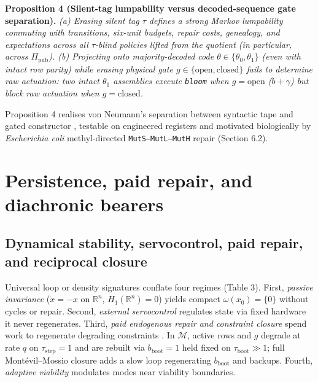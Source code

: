 \documentclass[12pt,letterpaper]{article}
\begin{document}
\textbf{Proposition 4 (Silent-tag lumpability versus decoded-sequence
gate separation).} \emph{(a) Erasing silent tag \(\tau\) defines a
strong Markov lumpability \citep{burkeRosenblatt1958} commuting with
transitions, six-unit budgets, repair costs, genealogy, and expectations
across all \(\tau\)-blind policies lifted from the quotient (in
particular, across \(\Pi_{\mathrm{pub}}\)). (b) Projecting onto
majority-decoded code \(\theta \in \{\theta_0, \theta_1\}\) (even with
intact row parity) while erasing physical gate
\(g \in \{\mathrm{open}, \mathrm{closed}\}\) fails to determine raw
actuation: two intact \(\theta_1\) assemblies execute \texttt{bloom}
when \(g=\mathrm{open}\) (\(b+\gamma\)) but block raw actuation when
\(g=\mathrm{closed}\).}

Proposition 4 realises von Neumann's \citeyearpar{vonNeumann1966}
separation between syntactic tape and gated constructor
\citep{rosen1991, deacon2011}, testable on engineered registers and
motivated biologically by \emph{Escherichia coli} methyl-directed
\texttt{MutS--MutL--MutH} repair
\citep{auWelshModrich1992, hasanLeach2015} (Section 6.2).

\section{Persistence, paid repair, and diachronic
bearers}\label{persistence-paid-repair-and-diachronic-bearers}

\subsection{Dynamical stability, servocontrol, paid repair, and
reciprocal
closure}\label{dynamical-stability-servocontrol-paid-repair-and-reciprocal-closure}

Universal loop or density signatures \citep{friston2013} conflate four
regimes (Table 3). First, \emph{passive invariance} (\(\dot{x} = -x\) on
\(\mathbb{R}^n\), \(H_1(\mathbb{R}^n) = 0\)) yields compact
\(\omega(x_0) = \{0\}\) without cycles or repair. Second, \emph{external
servocontrol} \citep{rosenblueth1943, conantAshby1970} regulates state
via fixed hardware it never regenerates. Third, \emph{paid endogenous
repair and constraint closure}
\citetext{\citealp[\S{}\S{}64--65]{kant1790}; \citealp{varela1974}; \citealp{maturanaVarela1980}; \citealp{weberVarela2002}; \citealp{rosen1991}; \citealp{kauffman1993}; \citealp{deacon2011}; \citealp{mossio2009}; \citealp{montevilMossio2015}}
spend work to regenerate degrading constraints
\citep{jonas1966, thompson2007}. In \(\mathcal{M}\), active rows and
\(g\) degrade at rate \(q\) on \(\tau_{\mathrm{step}}=1\) and are
rebuilt via \(b_{\mathrm{boot}}=1\) held fixed on
\(\tau_{\mathrm{boot}} \gg 1\); full Mont\'evil--Mossio closure adds a
slow loop regenerating \(b_{\mathrm{boot}}\) and backups. Fourth,
\emph{adaptive viability}
\citep{aubinCellina1984, diPaolo2005, barandiaran2009, bich2024}
modulates modes near viability boundaries.
\end{document}
